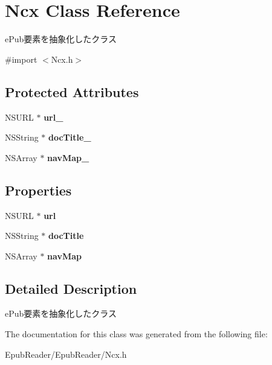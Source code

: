 \hypertarget{interface_ncx}{\section{Ncx Class Reference}
\label{interface_ncx}
}


e\-Pub要素を抽象化したクラス  




{\ttfamily \#import $<$Ncx.\-h$>$}

\subsection*{Protected Attributes}
\begin{DoxyCompactItemize}
\item 
\hypertarget{interface_ncx_a83253c2bb359f988e4dd2258c66e6252}{N\-S\-U\-R\-L $\ast$ {\bfseries url\-\_\-}}\label{interface_ncx_a83253c2bb359f988e4dd2258c66e6252}

\item 
\hypertarget{interface_ncx_ac35b7e97188ce6349cc7f6d3e579cef6}{N\-S\-String $\ast$ {\bfseries doc\-Title\-\_\-}}\label{interface_ncx_ac35b7e97188ce6349cc7f6d3e579cef6}

\item 
\hypertarget{interface_ncx_a383bed51836fe958210ebeddf8b3f54e}{N\-S\-Array $\ast$ {\bfseries nav\-Map\-\_\-}}\label{interface_ncx_a383bed51836fe958210ebeddf8b3f54e}

\end{DoxyCompactItemize}
\subsection*{Properties}
\begin{DoxyCompactItemize}
\item 
\hypertarget{interface_ncx_ae91b499c3d6d0328d6d7992ecb9da6dc}{N\-S\-U\-R\-L $\ast$ {\bfseries url}}\label{interface_ncx_ae91b499c3d6d0328d6d7992ecb9da6dc}

\item 
\hypertarget{interface_ncx_ac38099dd7bd59e1e70c6a9f49bac4eed}{N\-S\-String $\ast$ {\bfseries doc\-Title}}\label{interface_ncx_ac38099dd7bd59e1e70c6a9f49bac4eed}

\item 
\hypertarget{interface_ncx_abc43c7313f3f15cf0b794a2139dbdba3}{N\-S\-Array $\ast$ {\bfseries nav\-Map}}\label{interface_ncx_abc43c7313f3f15cf0b794a2139dbdba3}

\end{DoxyCompactItemize}


\subsection{Detailed Description}
e\-Pub要素を抽象化したクラス 

The documentation for this class was generated from the following file\-:\begin{DoxyCompactItemize}
\item 
Epub\-Reader/\-Epub\-Reader/Ncx.\-h\end{DoxyCompactItemize}

